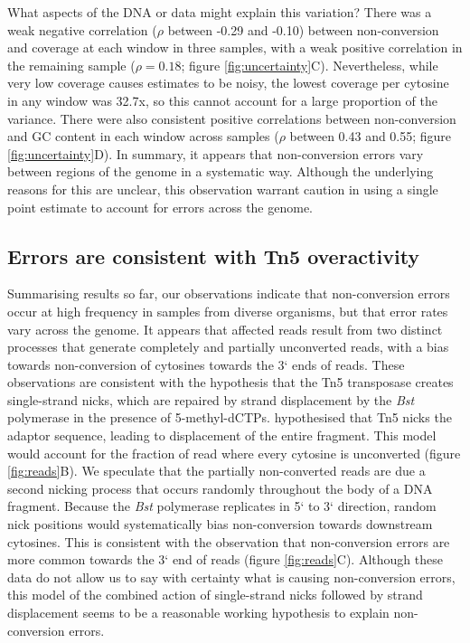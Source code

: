 \documentclass[twocolumn,twoside,lettersize]{article}
\begin{document}
What aspects of the DNA or data might explain this variation?
There was a weak negative correlation ($\rho$ between -0.29 and -0.10) between non-conversion and coverage at each window in three samples, with a weak positive correlation in the remaining sample ($\rho = 0.18$; figure \ref{fig:uncertainty}C).
Nevertheless, while very low coverage causes estimates to be noisy, the lowest coverage per cytosine in any window was 32.7x, so this cannot account for a large proportion of the variance.
There were also consistent positive correlations between non-conversion and GC content in each window across samples ($\rho$ between 0.43 and 0.55; figure \ref{fig:uncertainty}D).
In summary, it appears that non-conversion errors vary between regions of the genome in a systematic way.
Although the underlying reasons for this are unclear, this observation warrant caution in using a single point estimate to account for errors across the genome.

\subsection{Errors are consistent with Tn5 overactivity}

Summarising results so far, our observations indicate that non-conversion errors occur at high frequency in samples from diverse organisms, but that error rates vary across the genome.
It appears that affected reads result from two distinct processes that generate completely and partially unconverted reads, with a bias towards non-conversion of cytosines towards the 3` ends of reads.
These observations are consistent with the hypothesis that the Tn5 transposase creates single-strand nicks, which are repaired by strand displacement by the \textit{Bst} polymerase in the presence of 5-methyl-dCTPs.
\textcite{lu2015improved} hypothesised that Tn5 nicks the adaptor sequence, leading to displacement of the entire fragment.
This model would account for the fraction of read where every cytosine is unconverted (figure \ref{fig:reads}B).
We speculate that the partially non-converted reads are due a second nicking process that occurs randomly throughout the body of a DNA fragment.
Because the \textit{Bst} polymerase replicates in 5` to 3` direction, random nick positions would systematically bias non-conversion towards downstream cytosines.
This is consistent with the observation that non-conversion errors are more common towards the 3` end of reads (figure \ref{fig:reads}C).
Although these data do not allow us to say with certainty what is causing non-conversion errors, this model of the combined action of single-strand nicks followed by strand displacement seems to be a reasonable working hypothesis to explain non-conversion errors.
\end{document}
